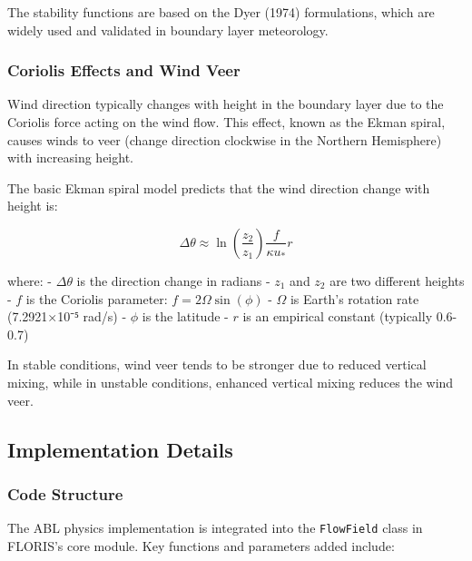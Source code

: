\documentclass[
]{article}
\begin{document}
The stability functions are based on the Dyer (1974) formulations, which
are widely used and validated in boundary layer meteorology.

\hypertarget{coriolis-effects-and-wind-veer}{%
\subsubsection{Coriolis Effects and Wind
Veer}\label{coriolis-effects-and-wind-veer}}

Wind direction typically changes with height in the boundary layer due
to the Coriolis force acting on the wind flow. This effect, known as the
Ekman spiral, causes winds to veer (change direction clockwise in the
Northern Hemisphere) with increasing height.

The basic Ekman spiral model predicts that the wind direction change
with height is:

\[\Delta\theta \approx \ln\left(\frac{z_2}{z_1}\right) \frac{f}{\kappa u_*} r\]

where: - \(\Delta\theta\) is the direction change in radians - \(z_1\)
and \(z_2\) are two different heights - \(f\) is the Coriolis parameter:
\(f = 2\Omega\sin(\phi)\) - \(\Omega\) is Earth's rotation rate
(7.2921×10⁻⁵ rad/s) - \(\phi\) is the latitude - \(r\) is an empirical
constant (typically 0.6-0.7)

In stable conditions, wind veer tends to be stronger due to reduced
vertical mixing, while in unstable conditions, enhanced vertical mixing
reduces the wind veer.

\hypertarget{implementation-details}{%
\subsection{Implementation Details}\label{implementation-details}}

\hypertarget{code-structure}{%
\subsubsection{Code Structure}\label{code-structure}}

The ABL physics implementation is integrated into the \texttt{FlowField}
class in FLORIS's core module. Key functions and parameters added
include:
\end{document}
